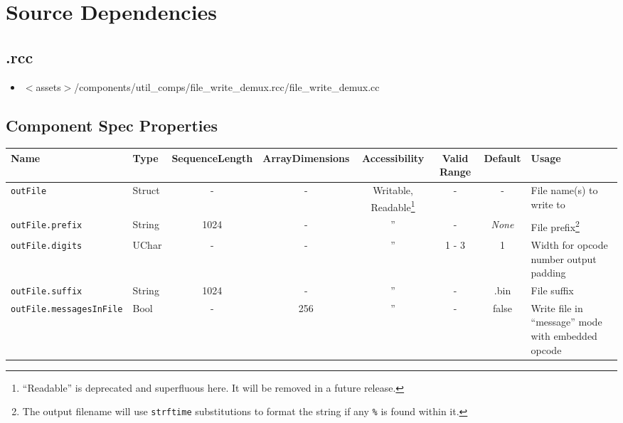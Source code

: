 \section*{Source Dependencies}
\subsection*{\comp.rcc}
\begin{itemize}
	\item $<$assets$>$/components/util\_comps/file\_write\_demux.rcc/file\_write\_demux.cc
\end{itemize}

\begin{landscape}
  \section*{Component Spec Properties}
  \begin{minipage}{\textwidth}
    \renewcommand*\footnoterule{} %
    \renewcommand{\thempfootnote}{\arabic{mpfootnote}} %
  \begin{scriptsize}
    \begin{tabular}{|p{3cm}|p{1.5cm}|c|c|c|c|c|p{7cm}|}
      \hline
      \rowcolor{blue}
      Name & Type & SequenceLength & ArrayDimensions & Accessibility & Valid Range & Default & Usage \\
      \hline
      \verb+outFile+ & Struct & - & - & Writable, Readable\footnote{``Readable'' is deprecated and superfluous here. It will be removed in a future release.}\setcounter{fnreadable}{\thempfootnote} & - & - &
      File name(s) to write to \\
      \hline
      \verb+outFile.prefix+ & String & 1024 & - & '' & - & \textit{None} &
      File prefix\footnote{\label{strftime}The output filename will use \texttt{strftime} substitutions to format the string if any \texttt{\%} is found within it.} \\
      \hline
      \verb+outFile.digits+ & UChar & - & - & '' & 1 - 3 & 1 &
      Width for opcode number output padding \\
      \hline
      \verb+outFile.suffix+ & String & 1024 & - & '' & - & .bin &
      File suffix \\
      \hline
      \verb+outFile.messagesInFile+ & Bool & - & 256 & '' & - & false &
      Write file in ``message'' mode with embedded opcode \\

\end{tabular}
\end{scriptsize}
\end{minipage}
\end{landscape}
